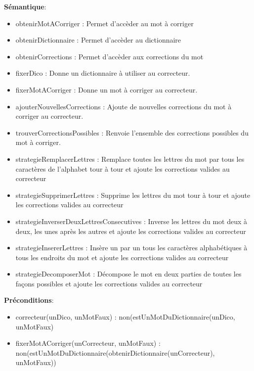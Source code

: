 \documentclass{article}
\begin{document}
    \textbf{Sémantique}: \begin{itemize}[label=$\- $, leftmargin=2cm, itemsep=0cm]
        \item obtenirMotACorriger : Permet d'accèder au mot à corriger 
        \item obtenirDictionnaire : Permet d'accèder au dictionnaire 
        \item obtenirCorrections : Permet d'accèder aux corrections du mot
        \item fixerDico : Donne un dictionnaire à utiliser au correcteur.
        \item fixerMotACorriger : Donne un mot à corriger au correcteur.
        \item ajouterNouvellesCorrections : Ajoute de nouvelles corrections du mot à corriger au correcteur.
        \item trouverCorrectionsPossibles : Renvoie l'ensemble des corrections possibles du mot à corriger.
        \item strategieRemplacerLettres : Remplace toutes les lettres du mot par tous les caractères de l'alphabet tour à tour et ajoute les corrections valides au correcteur
        \item strategieSupprimerLettres : Supprime les lettres du mot tour à tour et ajoute les corrections valides au correcteur
        \item strategieInverserDeuxLettresConsecutives : Inverse les lettres du mot deux à deux, les unes après les autres et ajoute les corrections valides au correcteur
        \item strategieInsererLettres : Insère un par un tous les caractères alphabétiques à tous les endroits du mot et ajoute les corrections valides au correcteur
        \item strategieDecomposerMot : Décompose le mot en deux parties de toutes les façons possibles et ajoute les corrections valides au correcteur
    \end{itemize}
        
    \textbf{Préconditions}: \begin{itemize}[label=$\- $, leftmargin=2cm, itemsep=0cm]
        \item correcteur(unDico, unMotFaux) : non(estUnMotDuDictionnaire(unDico, unMotFaux)
        \item fixerMotACorriger(unCorrecteur, unMotFaux) :  non(estUnMotDuDictionnaire(obtenirDictionnaire(unCorrecteur), unMotFaux))
    \end{itemize}
        
\end{document}
